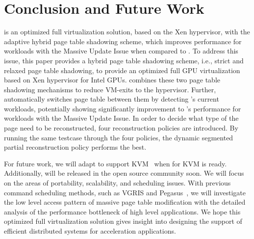 \section{Conclusion and Future Work}
\label{sec:conclusion}

\name{} is an optimized full \gpu{} virtualization solution, based on the Xen hypervisor, with the adaptive hybrid page table shadowing scheme, which improves performance for workloads with the Massive Update Issue when compared to \gvirt{}. To address this issue, this paper provides a hybrid page table shadowing scheme, i.e., strict and relaxed page table shadowing, to provide an optimized full GPU virtualization based on Xen hypervisor for Intel GPUs. \name{} combines these two page table shadowing mechanisms to reduce VM-exits to the hypervisor. Further, \name{} automatically switches page table between them by detecting \gpu{}'s current workloads, potentially showing significantly improvement to \gvirt{}'s performance for workloads with the Massive Update Issue. In order to decide what type of the page need to be reconstructed, four reconstruction policies are introduced. By running the same testcase through the four policies, the dynamic segmented partial reconstruction policy performs the best.

For future work, we will adapt \name{} to support KVM~{\cite{kivity2007kvm}} when \gvirt{} for KVM is ready. Additionally,  \name{} will be released in the open source community soon. We will focus on the areas of portability, scalability, and scheduling issues. With previous \gpu{} command scheduling methods, such as VGRIS and Pegasus~{\cite{deelman2005pegasus}}, we will investigate the low level access pattern of massive page table modification with the detailed analysis of the performance bottleneck of high level applications. We hope this optimized full \gpu{} virtualization solution gives insight into designing the support of efficient distributed systems for \gpu{} acceleration applications.
